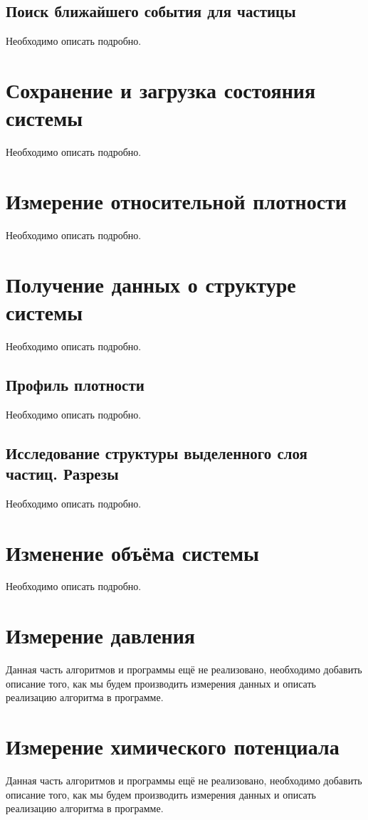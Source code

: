 \documentclass[a4paper]{article}
\begin{document}
\subsection{Поиск ближайшего события для частицы}
Необходимо описать подробно.



\newpage
\section{Сохранение и загрузка состояния системы}
Необходимо описать подробно.

\newpage
\section{Измерение относительной плотности}
Необходимо описать подробно.

\newpage
\section{Получение данных о структуре системы}
Необходимо описать подробно.
\subsection{Профиль плотности}
Необходимо описать подробно.
\subsection{Исследование структуры выделенного слоя частиц. Разрезы}
Необходимо описать подробно.
\newpage
\section{Изменение объёма системы}
Необходимо описать подробно.

\newpage
\section{Измерение давления}
Данная часть алгоритмов и программы ещё не реализовано, необходимо добавить описание того, как мы будем производить измерения данных и описать реализацию алгоритма в программе.

\newpage
\section{Измерение химического потенциала}
Данная часть алгоритмов и программы ещё не реализовано, необходимо добавить описание того, как мы будем производить измерения данных и описать реализацию алгоритма в программе.
\end{document}
